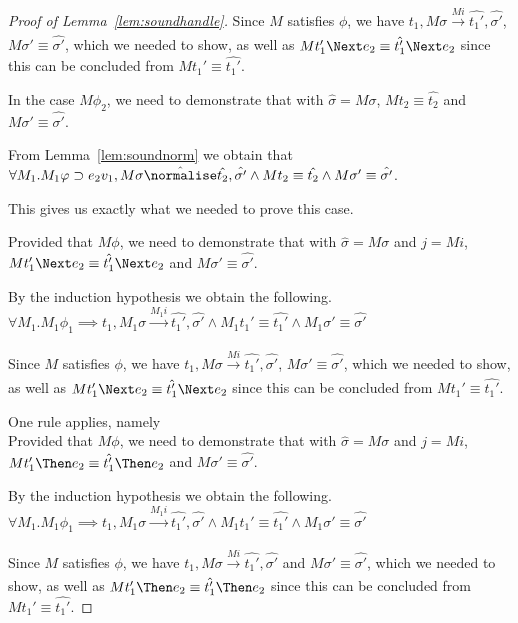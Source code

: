 \begin{proof}[Proof of Lemma~\ref{lem:soundhandle}]
{{  Since $M$ satisfies $\phi$, we have $t_1,M\sigma \xrightarrow[]{M i} \hat{t_1'},\hat{\sigma'}$, $M\sigma'\equiv\hat{\sigma'}$,
  which we needed to show, as well as $M t_1' \Next e_2 \equiv \hat{t_1'}\Next e_2$ since this can be concluded from $M t_1'\equiv \hat{t_1'}$.

  In the case $M\phi_2$, we need to demonstrate that  with $\hat{\sigma}=M\sigma$,
  $M t_2 \equiv \hat{t_2}$ and $M\sigma'\equiv\hat{\sigma'}$.

  From Lemma~\ref{lem:soundnorm} we obtain that $\forall M_1. M_1 \phi \implies e_2 v_1,M\sigma\hat{\normalise}\hat{t_2},\hat{\sigma'}\land M t_2\equiv\hat{t_2}\land M \sigma'\equiv\hat{\sigma'}$.

  This gives us exactly what we needed to prove this case.
    }

  {
  Provided that $M\phi$, we need to demonstrate that  with $\hat{\sigma}=M\sigma$ and $j= M i$,
  $M t_1' \Next e_2 \equiv \hat{t_1'}\Next e_2$ and $M\sigma'\equiv\hat{\sigma'}$.

  By the induction hypothesis we obtain the following.\\
  $\forall M_1 . M_1 \phi_1 \implies t_1,M_1\sigma \xrightarrow[]{M_1 i} \hat{t_1'},\hat{\sigma'}\land M_1 t_1'\equiv\hat{t_1'}\land M_1\sigma' \equiv \hat{\sigma'}$

  Since $M$ satisfies $\phi$, we have $t_1,M\sigma \xrightarrow[]{M i} \hat{t_1'},\hat{\sigma'}$, $M\sigma'\equiv\hat{\sigma'}$,
  which we needed to show, as well as $M t_1' \Next e_2 \equiv \hat{t_1'}\Next e_2$ since this can be concluded from $M t_1'\equiv \hat{t_1'}$.
  }
  }

  {One rule applies, namely \\
  Provided that $M\phi$, we need to demonstrate that  with $\hat{\sigma}=M\sigma$ and $j= M i$,
  $M t_1'\Then e_2\equiv \hat{t_1'}\Then e_2$ and $M\sigma'\equiv\hat{\sigma'}$.

  By the induction hypothesis we obtain the following.\\
  $\forall M_1 . M_1 \phi_1 \implies t_1,M_1\sigma \xrightarrow[]{M_1 i} \hat{t_1'},\hat{\sigma'}\land M_1 t_1'\equiv\hat{t_1'}\land M_1\sigma' \equiv \hat{\sigma'}$

  Since $M$ satisfies $\phi$, we have $t_1,M\sigma \xrightarrow[]{M i} \hat{t_1'},\hat{\sigma'}$ and $M\sigma'\equiv\hat{\sigma'}$,
  which we needed to show, as well as $M t_1' \Then e_2 \equiv \hat{t_1'}\Then e_2$ since this can be concluded from $M t_1'\equiv \hat{t_1'}$.

}
\end{proof}
